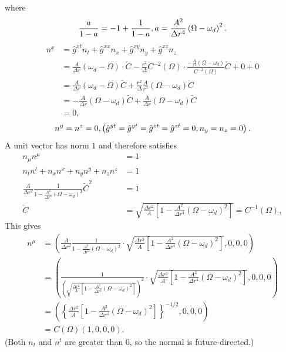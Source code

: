 \documentclass[english]{article}
\begin{document}
 where 
\[
\frac{a}{1-a}=-1+\frac{1}{1-a},\hfill a=\frac{A^{2}}{\Delta r^{4}}\left(\Omega-\omega_{d}\right)^{2}.
\]
 {}
\begin{align*}
n^{x} & =\hat{g}^{xt}n_{t}+\hat{g}^{xx}n_{x}+\hat{g}^{xy}n_{y}+\hat{g}^{xz}n_{z}\\
 & =\frac{A}{\Delta r}\left(\omega_{d}-\Omega\right)\cdot\tilde{C}-\frac{r^{2}}{\Delta}C^{-2}\left(\Omega\right)\cdot\frac{-\frac{A}{r^{3}}\left(\Omega-\omega_{d}\right)}{C^{-2}\left(\Omega\right)}\tilde{C}+0+0\\
 & =\frac{A}{\Delta r}\left(\omega_{d}-\Omega\right)\tilde{C}+\frac{r^{2}}{\Delta}\frac{A}{r^{3}}\left(\Omega-\omega_{d}\right)\tilde{C}\\
 & =-\frac{A}{\Delta r}\left(\Omega-\omega_{d}\right)\tilde{C}+\frac{A}{\Delta r}\left(\Omega-\omega_{d}\right)\tilde{C}\\
 & =0,
\end{align*}
 {}
\[
n^{y}=n^{z}=0,\hfill\left(\hat{g}^{yt}=\hat{g}^{yt}=\hat{g}^{zt}=\hat{g}^{zt}=0,n_{y}=n_{z}=0\right).
\]
 A unit vector has norm $1$ and therefore satisfies 
\begin{align*}
n_{\mu}n^{\mu} & =1\\
n_{t}n^{t}+n_{x}n^{x}+n_{y}n^{y}+n_{z}n^{z} & =1\\
\frac{A}{\Delta r^{2}}\frac{1}{1-\frac{A^{2}}{\Delta r^{4}}\left(\Omega-\omega_{d}\right)^{2}}\tilde{C}^{2} & =1\\
\tilde{C} & =\sqrt{\frac{\Delta r^{2}}{A}\left[1-\frac{A^{2}}{\Delta r^{4}}\left(\Omega-\omega_{d}\right)^{2}\right]}=C^{-1}\left(\Omega\right),
\end{align*}
 This gives 
\begin{align*}
n^{\mu} & =\left(\frac{A}{\Delta r^{2}}\frac{1}{1-\frac{A^{2}}{\Delta r^{4}}\left(\Omega-\omega_{d}\right)^{2}}\cdot\sqrt{\frac{\Delta r^{2}}{A}\left[1-\frac{A^{2}}{\Delta r^{4}}\left(\Omega-\omega_{d}\right)^{2}\right]},0,0,0\right)\\
 & =\left(\frac{1}{\left(\sqrt{\frac{\Delta r^{2}}{A}\left[1-\frac{A^{2}}{\Delta r^{4}}\left(\Omega-\omega_{d}\right)^{2}\right]}\right)^{2}}\cdot\sqrt{\frac{\Delta r^{2}}{A}\left[1-\frac{A^{2}}{\Delta r^{4}}\left(\Omega-\omega_{d}\right)^{2}\right]},0,0,0\right)\\
 & =\left(\left\{ \frac{\Delta r^{2}}{A}\left[1-\frac{A^{2}}{\Delta r^{4}}\left(\Omega-\omega_{d}\right)^{2}\right]\right\} ^{-1/2},0,0,0\right)\\
 & =C\left(\Omega\right)\left(1,0,0,0\right).
\end{align*}
 (Both $n_{t}$ and $n^{t}$ are greater than $0$, so the normal
is future-directed.)
\end{document}
